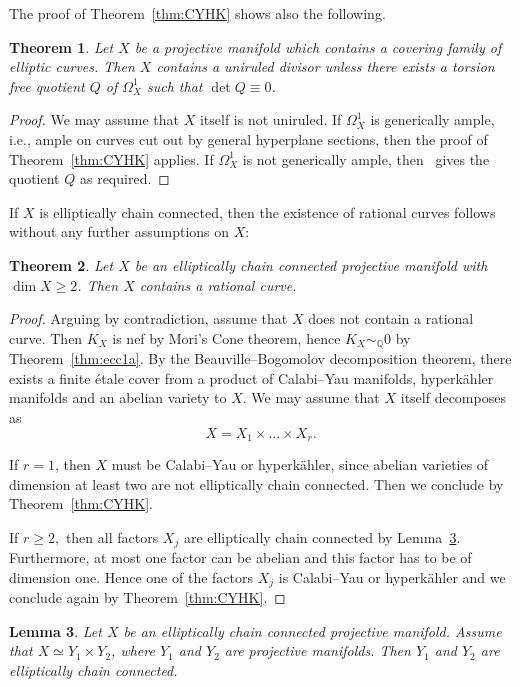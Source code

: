 \documentclass[11pt]{article}
\newtheorem{theo}{Theorem}[section]
\newtheorem{lemm}[theo]{Lemma}
\theoremstyle{definition}
\numberwithin{equation}{section}
\numberwithin{figure}{section}
\numberwithin{table}{section}
\newcommand{\Qbb}{\mathbb{Q}} %
\begin{document}
The proof of Theorem~\ref{thm:CYHK} shows also the following.

\begin{theo}\label{theo:main6.7}
Let $X$ be a projective manifold which contains a covering family of elliptic curves. Then $X$ contains a uniruled divisor unless there exists a torsion free quotient $Q$ of $ \Omega^1_X $ such that $\det Q \equiv 0$.
\end{theo}

\begin{proof}
We may assume that $X$ itself is not uniruled. If $\Omega^1_X $ is generically ample, i.e., ample on curves cut out by general hyperplane sections, then the proof of Theorem~\ref{thm:CYHK} applies. If $\Omega^1_X $ is not generically ample, then~\cite[Proposition~2]{Pe11} gives the quotient $Q$ as required.
\end{proof}

If $X$ is elliptically chain connected, then the existence of rational curves follows without any further assumptions on $X$:

\begin{theo}\label{thm:ellipticrational}
Let $X$ be an elliptically chain connected projective manifold with $\dim X \geq 2$. Then $X$ contains a rational curve.
\end{theo}

\begin{proof}
Arguing by contradiction, assume that $X$ does not contain a rational curve. Then $K_X$ is nef by Mori's Cone theorem, hence $K_X \sim_\Qbb0$ by Theorem~\ref{thm:ecc1a}. By the Beauville--Bogomolov decomposition theorem, there exists a finite étale cover from a product of Calabi--Yau manifolds, hyperkähler manifolds and an abelian variety to $X$. We may assume that $X$ itself decomposes as
\[
X = X_1 \times \ldots \times X_r.
\]

If $r = 1$, then $X$ must be Calabi--Yau or hyperkähler, since abelian varieties of dimension at least two are not elliptically chain connected. Then we conclude by Theorem~\ref{thm:CYHK}.

If $r \geq 2,$ then all factors $X_j$ are elliptically chain connected by Lemma~\ref{lem:conn}. Furthermore, at most one factor can be abelian and this factor has to be of dimension one. Hence one of the factors $X_j$ is Calabi--Yau or hyperkähler and we conclude again by Theorem~\ref{thm:CYHK}.
\end{proof}

\begin{lemm}\label{lem:conn}
Let $X$ be an elliptically chain connected projective manifold. Assume that $X \simeq Y_1 \times Y_2$, where $Y_1$ and $Y_2$ are projective manifolds. Then $Y_1$ and $Y_2$ are elliptically chain connected.
\end{lemm}
\end{document}
